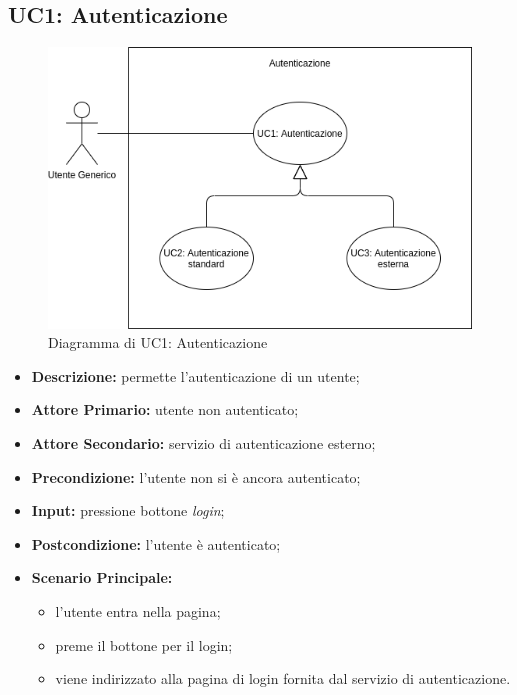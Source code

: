 \subsection{UC1: Autenticazione}
\label{sec:UC1}
\begin{figure}[!ht]
    \caption{Diagramma di UC1: Autenticazione}
    \vspace{10px}
    \includegraphics[scale=0.5]{../../../Images/AnalisiRequisiti/UC01}
    \centering
\end{figure}
\begin{itemize}
    \item \textbf{Descrizione:} permette l'autenticazione di un utente;
    \item \textbf{Attore Primario:} utente non autenticato;
    \item \textbf{Attore Secondario:} servizio di autenticazione esterno;
    \item \textbf{Precondizione:} l'utente non si è ancora autenticato;
    \item \textbf{Input:} pressione bottone \textit{login};
    \item \textbf{Postcondizione:} l'utente è autenticato;
    \item \textbf{Scenario Principale:}
          \begin{itemize}
              \item l'utente entra nella pagina;
              \item preme il bottone per il login;
              \item viene indirizzato alla pagina di login fornita dal servizio di autenticazione.
          \end{itemize}
\end{itemize}
\newpage